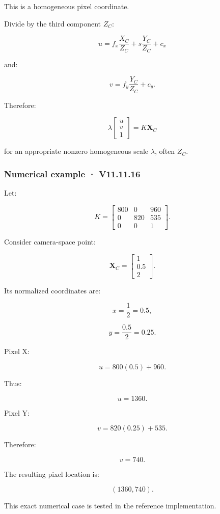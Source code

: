 This is a homogeneous pixel coordinate.

Divide by the third component \(Z_C\):

\[
 \boxed{ u=f_x\frac{X_C}{Z_C} +s\frac{Y_C}{Z_C} +c_x }
\]

and:

\[
 \boxed{ v=f_y\frac{Y_C}{Z_C} +c_y }.
\]

Therefore:

\[
 \boxed{ \lambda \begin{bmatrix}u\\v\\1\end{bmatrix} = K\mathbf X_C }
\]

for an appropriate nonzero homogeneous scale \(\lambda\), often \(Z_C\).

\subsubsection{Numerical example · V11.11.16}\label{numerical-example-v11.11.16}

Let:

\[
 K= \begin{bmatrix} 800&0&960\\ 0&820&535\\ 0&0&1 \end{bmatrix}.
\]

Consider camera-space point:

\[
 \mathbf X_C= \begin{bmatrix}1\\0.5\\2\end{bmatrix}.
\]

Its normalized coordinates are:

\[
 x=\frac12=0.5,
\]

\[
 y=\frac{0.5}{2}=0.25.
\]

Pixel X:

\[
 u=800(0.5)+960.
\]

Thus:

\[
 \boxed{u=1360}.
\]

Pixel Y:

\[
 v=820(0.25)+535.
\]

Therefore:

\[
 \boxed{v=740}.
\]

The resulting pixel location is:

\[
 \boxed{(1360,740)}.
\]

This exact numerical case is tested in the reference implementation.

